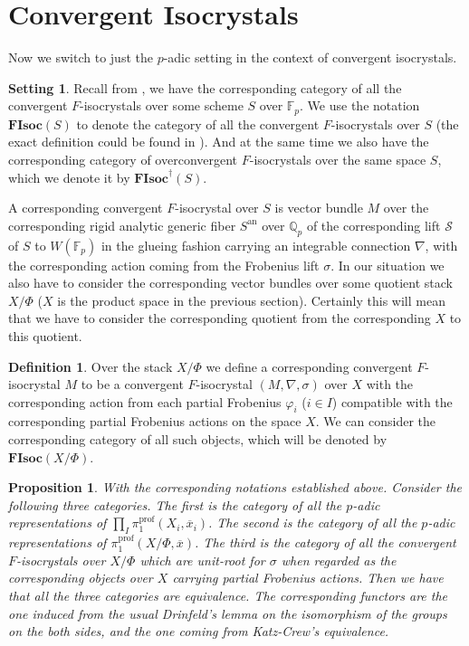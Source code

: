 \documentclass[11pt]{book}
\newtheorem{proposition}[theorem]{Proposition}
\theoremstyle{definition}
\newtheorem{definition}[theorem]{Definition}
\numberwithin{equation}{section}
\newtheorem{setting}[theorem]{Setting}
\begin{document}
\newpage

\section{Convergent Isocrystals}


\indent Now we switch to just the $p$-adic setting in the context of convergent isocrystals. 


\begin{setting}
Recall from \cite[Definition 2.1]{Ked1}, we have the corresponding category of all the convergent $F$-isocrystals over some scheme $S$ over $\mathbb{F}_p$. We use the notation $\textbf{FIsoc}(S)$ to denote the category of all the convergent $F$-isocrystals over $S$ (the exact definition could be found in \cite[Definition 2.1]{Ked1}). And at the same time we also have the corresponding category of overconvergent $F$-isocrystals over the same space $S$, which we denote it by $\textbf{FIsoc}^\dagger(S)$. 
\end{setting}

\indent A corresponding convergent $F$-isocrystal over $S$ is vector bundle $M$ over the corresponding rigid analytic generic fiber $S^\mathrm{an}$ over $\mathbb{Q}_p$ of the corresponding lift $\mathcal{S}$ of $S$ to $W(\mathbb{F}_p)$ in the glueing fashion carrying an integrable connection $\nabla$, with the corresponding action coming from the Frobenius lift $\sigma$. In our situation we also have to consider the corresponding vector bundles over some quotient stack $X/\Phi$ ($X$ is the product space in the previous section). Certainly this will mean that we have to consider the corresponding quotient from the corresponding $X$ to this quotient.


\begin{definition}
Over the stack $X/\Phi$ we define a corresponding convergent $F$-isocrystal $M$ to be a convergent $F$-isocrystal $(M,\nabla,\sigma)$ over $X$ with the corresponding action from each partial Frobenius $\varphi_i$ ($i\in I$) compatible with the corresponding partial Frobenius actions on the space $X$. We can consider the corresponding category of all such objects, which will be denoted by $\textbf{FIsoc}(X/\Phi)$. 	
\end{definition}



\begin{proposition}
With the corresponding notations established above. Consider the following three categories. The first is the category of all the $p$-adic representations of $\prod_{I} \pi_1^\mathrm{prof}(X_i,\overline{x}_i)$. The second is the category of all the $p$-adic representations of $\pi_1^\mathrm{prof}(X/\Phi,\overline{x})$. The third is the category of all the convergent $F$-isocrystals over $X/\Phi$ which are unit-root for $\sigma$ when regarded as the corresponding objects over $X$ carrying partial Frobenius actions. Then we have that all the three categories are equivalence. The corresponding functors are the one induced from the usual Drinfeld's lemma on the isomorphism of the groups on the both sides, and the one coming from Katz-Crew's equivalence.	
\end{proposition}
	
\end{document}
